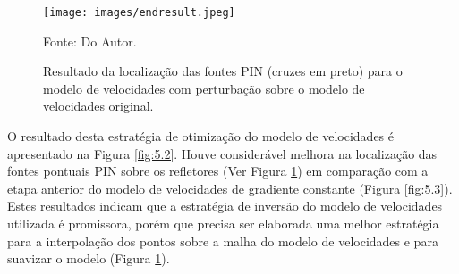 \begin{figure}[H]
\caption{Resultado da localização das fontes PIN (cruzes em preto)
para o modelo de velocidades com perturbação sobre o modelo de velocidades original.}
\begin{center}
\texttt{[image: images/endresult.jpeg]}
\vspace{-0.3cm}
\end{center}
\begin{center}
 Fonte: Do Autor.
\end{center}
\label{fig:5.4}
\end{figure}

O resultado desta estratégia de otimização do modelo de velocidades é apresentado na Figura \ref{fig:5.2}.
Houve considerável melhora na localização das fontes pontuais PIN sobre os refletores (Ver
Figura \ref{fig:5.4}) em comparação com a etapa anterior do modelo de velocidades de
gradiente constante (Figura \ref{fig:5.3}).
Estes resultados indicam que a estratégia de inversão do modelo de velocidades utilizada é promissora, porém
que precisa ser elaborada uma melhor estratégia para a interpolação dos pontos sobre a malha do modelo de
velocidades e para suavizar o modelo (Figura \ref{fig:5.4}).
